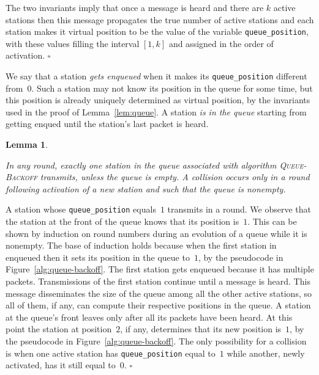 \documentclass[11pt]{article}
\newcommand{\qed}{\hfill $\square$ \smallbreak}
\newenvironment{proof}{\noindent{\bf Proof:}}{\qed}
\newtheorem{lemma}{Lemma}
\begin{document}
\begin{proof}
The two invariants imply that once a message is heard and there are $k$ active stations then this message propagates the true number of active stations and each station makes it virtual position to be the value of the variable \texttt{queue\_position}, with these values filling the interval $[1,k]$ and assigned in the order of activation. 
\end{proof} 

We say that a station \emph{gets enqueued} when it makes its \texttt{queue\_position} different from~$0$.
Such a station may not know its position in the queue for some time, but this position is already uniquely determined as virtual position, by the invariants used in the proof of Lemma~\ref{lem:queue}.
A station \emph{is in the queue} starting from getting enqued until the station's last packet is heard.



\begin{lemma}
\label{lem:queue-transmits}

In any round, exactly one station in the queue associated with algorithm \textsc{Queue-Backoff} transmits, unless the queue is empty.
A collision occurs only in a round following activation of a new station and such that the queue is nonempty.
\end{lemma}

\begin{proof}
A station whose \texttt{queue\_position} equals~$1$ transmits in a round.
We observe that the station at the front of the queue knows that its position is~$1$.
This can be shown by induction on round numbers during an evolution of a queue while it is nonempty.
The base of induction holds because when the first station in enqueued then it sets its position in the queue to~$1$, by the pseudocode in Figure~\ref{alg:queue-backoff}.
The first station gets enqueued because it has multiple packets.
Transmissions of the first station continue until a message is heard.
This message disseminates the size of the queue among all the other active stations, so all of them, if any, can compute their respective positions in the queue.
A station at the queue's front leaves only after all its packets have been heard.
At this point the station at position~$2$, if any, determines that its new position is~$1$, by the pseudocode in Figure~\ref{alg:queue-backoff}.
The only possibility for a collision is when one active station has \texttt{queue\_position} equal to~$1$ while another, newly activated, has it still equal to~$0$.
\end{proof}
\end{document}
